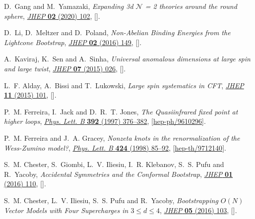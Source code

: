 \begin{thebibliography}{10}
D.~Gang and M.~Yamazaki, \emph{{Expanding 3d $ \mathcal{N} $ = 2 theories
  around the round sphere}},
  \href{http://dx.doi.org/10.1007/JHEP02(2020)102}{\emph{JHEP} {\bfseries 02}
  (2020) 102}, [\href{https://arxiv.org/abs/1912.09617}{{}}].

D.~Li, D.~Meltzer and D.~Poland, \emph{{Non-Abelian Binding Energies from the
  Lightcone Bootstrap}},
  \href{http://dx.doi.org/10.1007/JHEP02(2016)149}{\emph{JHEP} {\bfseries 02}
  (2016) 149}, [\href{https://arxiv.org/abs/1510.07044}{{}}].

A.~Kaviraj, K.~Sen and A.~Sinha, \emph{{Universal anomalous dimensions at large
  spin and large twist}},
  \href{http://dx.doi.org/10.1007/JHEP07(2015)026}{\emph{JHEP} {\bfseries 07}
  (2015) 026}, [\href{https://arxiv.org/abs/1504.00772}{{}}].

L.~F. Alday, A.~Bissi and T.~Lukowski, \emph{{Large spin systematics in CFT}},
  \href{http://dx.doi.org/10.1007/JHEP11(2015)101}{\emph{JHEP} {\bfseries 11}
  (2015) 101}, [\href{https://arxiv.org/abs/1502.07707}{{}}].

P.~M. Ferreira, I.~Jack and D.~R.~T. Jones, \emph{{The Quasiinfrared fixed
  point at higher loops}},
  \href{http://dx.doi.org/10.1016/S0370-2693(96)01549-3}{\emph{Phys. Lett. B}
  {\bfseries 392} (1997) 376--382},
  [\href{https://arxiv.org/abs/hep-ph/9610296}{{\ttfamily hep-ph/9610296}}].

P.~M. Ferreira and J.~A. Gracey, \emph{{Nonzeta knots in the renormalization of
  the Wess-Zumino model?}},
  \href{http://dx.doi.org/10.1016/S0370-2693(98)00169-5}{\emph{Phys. Lett. B}
  {\bfseries 424} (1998) 85--92},
  [\href{https://arxiv.org/abs/hep-th/9712140}{{\ttfamily hep-th/9712140}}].

S.~M. Chester, S.~Giombi, L.~V. Iliesiu, I.~R. Klebanov, S.~S. Pufu and
  R.~Yacoby, \emph{{Accidental Symmetries and the Conformal Bootstrap}},
  \href{http://dx.doi.org/10.1007/JHEP01(2016)110}{\emph{JHEP} {\bfseries 01}
  (2016) 110}, [\href{https://arxiv.org/abs/1507.04424}{{}}].

S.~M. Chester, L.~V. Iliesiu, S.~S. Pufu and R.~Yacoby, \emph{{Bootstrapping
  $O(N)$ Vector Models with Four Supercharges in $3 \leq d \leq4$}},
  \href{http://dx.doi.org/10.1007/JHEP05(2016)103}{\emph{JHEP} {\bfseries 05}
  (2016) 103}, [\href{https://arxiv.org/abs/1511.07552}{{}}].


\end{thebibliography}
